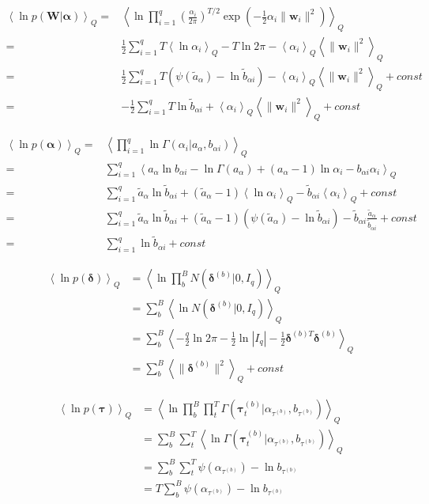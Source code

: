 \documentclass[10pt]{article}
\newcommand{\Angle}[1]{\left \langle #1 \right \rangle}
\newcommand{\Eq}[1]{\Angle{#1}_Q}
\begin{document}
    \begin{align}
        \Eq{\ln{p(\bm{W} \vert \bm{\alpha})}}=&\Eq{\ln{\prod_{i=1}^q \left( \frac{\alpha_i}{2\pi} \right)^{T/2} \exp \left( -\frac{1}{2}\alpha_i \| \bm{w}_i \|^2 \right) }} \nonumber \\
        =&\frac{1}{2}\sum_{i=1}^q T\Eq{\ln{\alpha_i}} - T\ln{2\pi} -\Eq{\alpha_i} \Eq{\| \bm{w}_i \|^2 } \nonumber \\
        =&\frac{1}{2}\sum_{i=1}^q T(\psi(\tilde{a}_\alpha)-\ln{\tilde{b}_{\alpha i}})-\Eq{\alpha_i} \Eq{\| \bm{w}_i \|^2 } + const \nonumber \\
        =&-\frac{1}{2}\sum_{i=1}^q T\ln{\tilde{b}_{\alpha i}}+\Eq{\alpha_i} \Eq{\| \bm{w}_i \|^2 } + const
        \label{pwalpha}
    \end{align}

    \begin{align}
        \Eq{\ln{p(\bm{\alpha})}}=&\Eq{\prod_{i=1}^q \ln \Gamma(\alpha_i \vert a_\alpha,b_{\alpha i})} \nonumber \\
        =&\sum_{i=1}^q \Eq{a_\alpha\ln{b_{\alpha i}}-\ln{\Gamma(a_\alpha)}+(a_\alpha-1)\ln{\alpha_i}-b_{\alpha i} \alpha_i} \nonumber \\
        =&\sum_{i=1}^q \tilde{a}_\alpha\ln{\tilde{b}_{\alpha i}}+(\tilde{a}_\alpha-1)\Eq{\ln{\alpha_i}}-\tilde{b}_{\alpha i}\Eq{\alpha_i} + const \nonumber \\
        =&\sum_{i=1}^q \tilde{a}_\alpha\ln{\tilde{b}_{\alpha i}}+(\tilde{a}_\alpha-1)(\psi(\tilde{a}_\alpha)-\ln{\tilde{b}_{\alpha i}})-\tilde{b}_{\alpha i}\frac{\tilde{a}_\alpha}{\tilde{b}_{\alpha i}} + const \nonumber \\
        =&\sum_{i=1}^q \ln{\tilde{b}_{\alpha i}} + const
        \label{palpha}
    \end{align}

    \begin{align}
        \Eq{\ln{p(\bm{\delta})}}&=\Eq{\ln{\prod_b^B N(\bm{\delta}^{(b)}|0,I_q)}} \nonumber \\
        &=\sum_b^B\Eq{\ln{N(\bm{\delta}^{(b)}|0,I_q)}} \nonumber \\
        &=\sum_b^B\Eq{-\frac{q}{2}\ln{2\pi} -\frac{1}{2}\ln{|I_q|} - \frac{1}{2}\bm{\delta}^{(b)T}\bm{\delta}^{(b)}} \nonumber \\
        &=\sum_b^B\Eq{\|\bm{\delta}^{(b)}\|^2} + const
        \label{pdelta}
    \end{align}

    \begin{align}
        \Eq{\ln{p(\bm{\tau})}}&=\Eq{\ln{\prod_b^B\prod_t^T\Gamma(\bm{\tau}_t^{(b)}| \alpha_{\tau^{(b)}}, b_{\tau^{(b)}})}} \nonumber \\
        &=\sum_b^B\sum_t^T\Eq{\ln{\Gamma(\bm{\tau}_t^{(b)}| \alpha_{\tau^{(b)}}, b_{\tau^{(b)}})}} \nonumber \\
        &=\sum_b^B\sum_t^T \psi(\alpha_{\tau^{(b)}}) - \ln{b_{\tau^{(b)}}} \nonumber \\
        &=T\sum_b^B\psi(\alpha_{\tau^{(b)}}) - \ln{b_{\tau^{(b)}}}
        \label{ptau}
    \end{align}
\end{document}
